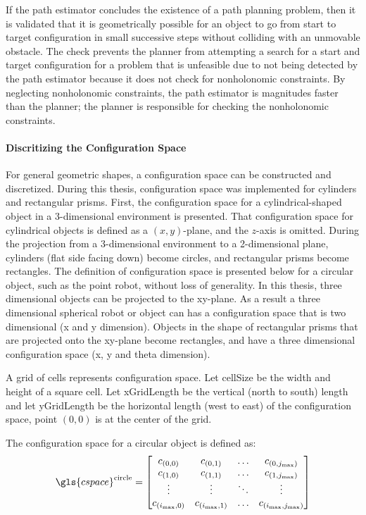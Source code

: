 If the path estimator concludes the existence of a path planning problem, then it is validated that it is geometrically possible for an object to go from start to target configuration in small successive steps without colliding with an unmovable obstacle. The check prevents the planner from attempting a search for a start and target configuration for a problem that is unfeasible due to not being detected by the path estimator because it does not check for nonholonomic constraints. By neglecting nonholonomic constraints, the path estimator is magnitudes faster than the planner; the planner is responsible for checking the nonholonomic constraints.

\paragraph{Discritizing the Configuration Space}
For general geometric shapes, a configuration space can be constructed and discretized. During this thesis, configuration space was implemented for cylinders and rectangular prisms. First, the configuration space for a cylindrical-shaped object in a 3-dimensional environment is presented. That configuration space for cylindrical objects is defined as a $(x, y)$-plane, and the $z$-axis is omitted. During the projection from a 3-dimensional environment to a 2-dimensional plane, cylinders (flat side facing down) become circles, and rectangular prisms become rectangles. The definition of configuration space is presented below for a circular object, such as the point robot, without loss of generality. In this thesis, three dimensional objects can be projected to the xy-plane. As a result a three dimensional spherical robot or object can has a configuration space that is two dimensional (\gls{x} and \gls{y} dimension). Objects in the shape of rectangular prisms that are projected onto the xy-plane become rectangles, and have a three dimensional configuration space (\gls{x}, \gls{y} and \gls{theta} dimension).\bs
\bs

A grid of cells represents configuration space. Let \gls{cellSize} be the width and height of a square cell. Let \gls{xGridLength} be the vertical (north to south) length and let \gls{yGridLength} be the horizontal length (west to east) of the configuration space, point $(0, 0)$ is at the center of the grid.\bs

The configuration space for a circular object is defined as:\bs
\[ \gls{cspace}^{\textrm{circle}} =
\begin{bmatrix}
  c_{(0,0)} & c_{(0,1)} & \hdots & c_{(0,j_{\textrm{max}})}\\
  c_{(1,0)} & c_{(1,1)} & \hdots & c_{(1,j_{\textrm{max}})}\\
  \vdots &  \vdots & \ddots & \vdots\\
  c_{(i_{\textrm{max}},0)} & c_{(i_{\textrm{max}},1)} & \hdots & c_{(i_{\textrm{max}},j_{\textrm{max}})}\\
\end{bmatrix}
\]


